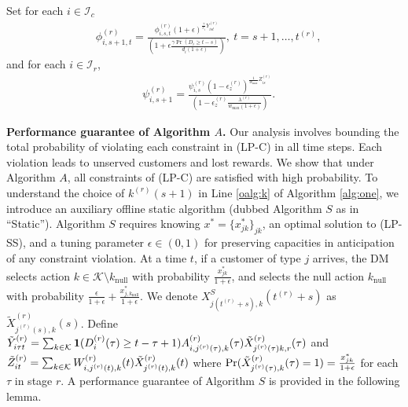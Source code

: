 \documentclass[letterpaper, 10 pt, conference]{ieeeconf}  %
\newcommand{\III}{\mathcal{I}}
\newcommand{\KKK}{\mathcal{K}}
\theoremstyle{plain}
\theoremstyle{definition}
\theoremstyle{remark}
\begin{document}
\begin{algorithm}[]
\begin{algorithmic}[1]
\State\label{oalg:weight} Set for each $i\in \III_c$
\begin{align}
&\phi^{(r)}_{i,s+1,t}=\frac{\phi^{(r)}_{i,s,t} (1+\epsilon)^{\frac{\gamma}{c_i} Y^{(r)}_{ist}}}{\left(1+\epsilon \frac{\gamma \Pr\left(D_i \geq t-s\right)}{d_i (1+\epsilon)}\right)}, ~t=s+1,\ldots,t^{(r)}, \nonumber 
\end{align}
and for each $i\in \III_r$,
\begin{align}
&\psi^{(r)}_{i,s+1}= \frac{\psi^{(r)}_{i,s} \left(1-\epsilon^{(r)}_{z}\right)^{\frac{1}{w_{\max}} Z^{(r)}_{is}}}{\left(1-\epsilon^{(r)}_{z} \frac{\lambda^{(r)}}{w_{\max}(1+\epsilon)}\right)}.  \nonumber
\end{align}
\EndFor \label{oalg:step_2_end}
\EndFor
\end{algorithmic}
\end{algorithm}


\textbf{Performance guarantee of Algorithm $A$.} Our analysis involves bounding the total probability of violating each constraint in (LP-C) in all time steps. Each violation leads to unserved customers and lost rewards. We show that under Algorithm $A$, all constraints of (LP-C) are satisfied with high probability. To understand the choice of $k^{(r)}(s+1)$ in Line \ref{oalg:k} of Algorithm \ref{alg:one}, we introduce an auxiliary offline static algorithm (dubbed Algorithm $S$ as in ``Static''). Algorithm $S$ requires knowing $x^* = \{x^*_{jk}\}_{jk}$, an optimal solution to (LP-SS), and a tuning parameter $\epsilon\in (0, 1)$ for preserving capacities in anticipation of any constraint violation. At a time $t$, if a customer of type $j$ arrives, the DM selects action $k\in \KKK\setminus k_{\text{null}}$ with probability $\frac{x_{jk}^*}{1+\epsilon}$, and selects the null action $k_{\text{null}}$ with probability $\frac{\epsilon}{1+\epsilon} + \frac{x_{j,k_{\text{null}}}^*}{1+\epsilon}$. We denote $X^S_{j(t^{(r)}+s),k}(t^{(r)}+s)$ as $\tilde{X}^{(r)}_{j^{(r)}(s),k}(s)$. Define $\tilde{Y}^{(r)}_{i \tau t} = \sum_{k \in \KKK} \mathbf{1}(D^{(r)}_{i}(\tau) \geq t - \tau +1) A^{(r)}_{i,j^{(r)}(\tau),k}(\tau) \Tilde{X}^{(r)}_{j^{(r)}(\tau)k,r}(\tau)$ and $\Tilde{Z}^{(r)}_{it} = \sum_{k \in \KKK} W^{(r)}_{i,j^{(r)}(t),k}(t) \Tilde{X}^{(r)}_{j^{(r)}(t),k}(t)$ where $\Pr(\Tilde{X}^{(r)}_{j^{(r)}(\tau),k}(\tau)=1 )=\frac{x^*_{jk}}{1+\epsilon}$ for each $\tau$ in stage $r$. A performance guarantee of Algorithm $S$ is provided in the following lemma.
\end{document}
